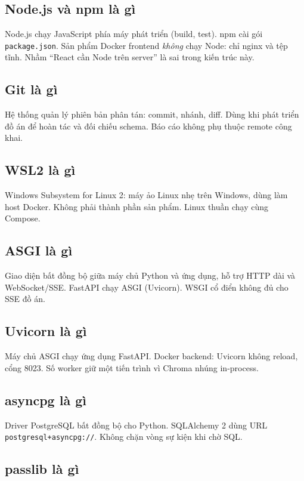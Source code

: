 \subsection{Node.js và npm là gì}

Node.js chạy JavaScript phía máy phát triển (build, test). npm cài gói
\texttt{package.json}. Sản phẩm Docker frontend \emph{không} chạy Node: chỉ
nginx và tệp tĩnh. Nhầm ``React cần Node trên server'' là sai trong kiến trúc
này.

\subsection{Git là gì}

Hệ thống quản lý phiên bản phân tán: commit, nhánh, diff. Dùng khi phát triển
đồ án để hoàn tác và đối chiếu schema. Báo cáo không phụ thuộc remote công khai.

\subsection{WSL2 là gì}

Windows Subsystem for Linux 2: máy ảo Linux nhẹ trên Windows, dùng làm host
Docker. Không phải thành phần sản phẩm. Linux thuần chạy cùng Compose.

\subsection{ASGI là gì}

Giao diện bất đồng bộ giữa máy chủ Python và ứng dụng, hỗ trợ HTTP dài và
WebSocket/SSE. FastAPI chạy ASGI (Uvicorn). WSGI cổ điển không đủ cho SSE đồ án.

\subsection{Uvicorn là gì}

Máy chủ ASGI chạy ứng dụng FastAPI. Docker backend: Uvicorn không reload, cổng
8023. Số worker giữ một tiến trình vì Chroma nhúng in-process.

\subsection{asyncpg là gì}

Driver PostgreSQL bất đồng bộ cho Python. SQLAlchemy 2 dùng URL
\texttt{postgresql+asyncpg://}. Không chặn vòng sự kiện khi chờ SQL.

\subsection{passlib là gì}

